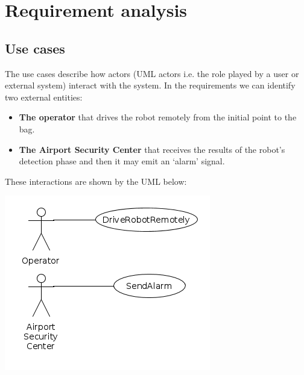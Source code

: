 \documentclass{llncs}
\newcommand{\labelsec}[1]{\label{sec:#1}}
\newcommand{\labelssec}[1]{\label{ssec:#1}}
\begin{document}
\section{Requirement analysis}
\labelsec{ReqAnalysis}

\subsection{Use cases}
\labelssec{UseCases}
The use cases describe how actors (UML actors i.e. the role played by a user or external system) interact with the system.
In the requirements we can identify two external entities:
\begin{itemize}
\item \textbf{The operator} that drives the robot remotely from the initial point to the bag.
\item \textbf{The Airport Security Center} that receives the results of the robot's detection phase and then it may emit an `alarm' signal.
\end{itemize}
These interactions are shown by the UML below:

\includegraphics[scale=0.5]{./img/usecase.png}
\end{document}
